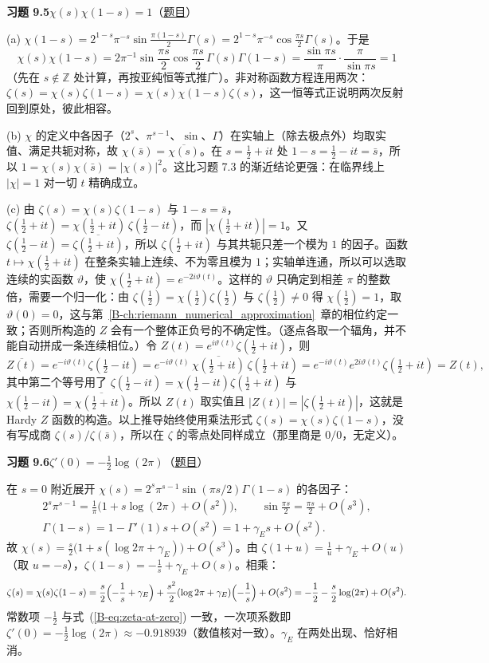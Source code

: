 \documentclass[11pt,a4paper]{article}
\newcommand{\bref}[1]{\ref*{B-#1}}
\newcommand{\Sol}[2]{%
  \par\addvspace{1.2em}\noindent
  \hypertarget{s:#1}{}\textbf{习题 #1\quad #2}\hfill{\small（\hyperlink{q:#1}{题目}）}\par
  \nopagebreak\smallskip}
\begin{document}
\Sol{9.5}{$\chi(s)\chi(1-s)=1$}
(a) $\chi(1-s)=2^{1-s}\pi^{-s}\sin\frac{\pi(1-s)}2\Gamma(s)=2^{1-s}\pi^{-s}\cos\frac{\pi s}2\Gamma(s)$。于是
\[
  \chi(s)\chi(1-s)=2\pi^{-1}\sin\frac{\pi s}2\cos\frac{\pi s}2\,\Gamma(s)\Gamma(1-s)=\frac{\sin\pi s}{\pi}\cdot\frac{\pi}{\sin\pi s}=1
\]
（先在 $s\notin\mathbb Z$ 处计算，再按亚纯恒等式推广）。非对称函数方程连用两次：$\zeta(s)=\chi(s)\zeta(1-s)=\chi(s)\chi(1-s)\zeta(s)$，这一恒等式正说明两次反射回到原处，彼此相容。

(b) $\chi$ 的定义中各因子（$2^s$、$\pi^{s-1}$、$\sin$、$\Gamma$）在实轴上（除去极点外）均取实值、满足共轭对称，故 $\chi(\bar s)=\overline{\chi(s)}$。在 $s=\tfrac12+it$ 处 $1-s=\tfrac12-it=\bar s$，所以
$1=\chi(s)\chi(\bar s)=|\chi(s)|^2$。这比习题 7.3 的渐近结论更强：在临界线上 $|\chi|=1$ 对一切 $t$ 精确成立。

(c) 由 $\zeta(s)=\chi(s)\zeta(1-s)$ 与 $1-s=\bar s$，$\zeta(\tfrac12+it)=\chi(\tfrac12+it)\,\zeta(\tfrac12-it)$，而 $|\chi(\tfrac12+it)|=1$。又 $\zeta(\tfrac12-it)=\overline{\zeta(\tfrac12+it)}$，所以 $\zeta(\tfrac12+it)$ 与其共轭只差一个模为 $1$ 的因子。函数 $t\mapsto\chi(\tfrac12+it)$ 在整条实轴上连续、不为零且模为 $1$；实轴单连通，所以可以选取连续的实函数 $\vartheta$，使 $\chi(\tfrac12+it)=e^{-2i\vartheta(t)}$。这样的 $\vartheta$ 只确定到相差 $\pi$ 的整数倍，需要一个归一化：由 $\zeta(\tfrac12)=\chi(\tfrac12)\zeta(\tfrac12)$ 与 $\zeta(\tfrac12)\ne0$ 得 $\chi(\tfrac12)=1$，取 $\vartheta(0)=0$，这与第~\bref{ch:riemann_numerical_approximation}~章的相位约定一致；否则所构造的 $Z$ 会有一个整体正负号的不确定性。（逐点各取一个辐角，并不能自动拼成一条连续相位。）令 $Z(t)=e^{i\vartheta(t)}\zeta(\tfrac12+it)$，则
\[
  \overline{Z(t)}=e^{-i\vartheta(t)}\zeta(\tfrac12-it)=e^{-i\vartheta(t)}\,\overline{\chi(\tfrac12+it)}\,\zeta(\tfrac12+it)=e^{-i\vartheta(t)}e^{2i\vartheta(t)}\zeta(\tfrac12+it)=Z(t),
\]
其中第二个等号用了 $\zeta(\tfrac12-it)=\chi(\tfrac12-it)\zeta(\tfrac12+it)$ 与 $\chi(\tfrac12-it)=\overline{\chi(\tfrac12+it)}$。所以 $Z(t)$ 取实值且 $|Z(t)|=|\zeta(\tfrac12+it)|$，这就是 Hardy $Z$ 函数的构造。以上推导始终使用乘法形式 $\zeta(s)=\chi(s)\zeta(1-s)$，没有写成商 $\zeta(s)/\zeta(\bar s)$，所以在 $\zeta$ 的零点处同样成立（那里商是 $0/0$，无定义）。

\Sol{9.6}{$\zeta'(0)=-\tfrac12\log(2\pi)$}
在 $s=0$ 附近展开 $\chi(s)=2^s\pi^{s-1}\sin(\pi s/2)\Gamma(1-s)$ 的各因子：
\[
\begin{gathered}
  2^s\pi^{s-1}=\frac1\pi\bigl(1+s\log(2\pi)+O(s^2)\bigr),\qquad
  \sin\frac{\pi s}2=\frac{\pi s}2+O(s^3),\\
  \Gamma(1-s)=1-\Gamma'(1)s+O(s^2)=1+\gamma_E s+O(s^2).
\end{gathered}
\]
故 $\chi(s)=\frac s2\bigl(1+s(\log2\pi+\gamma_E)\bigr)+O(s^3)$。由 $\zeta(1+u)=\frac1u+\gamma_E+O(u)$（取 $u=-s$），$\zeta(1-s)=-\frac1s+\gamma_E+O(s)$。相乘：
\[
  \zeta(s)=\chi(s)\zeta(1-s)=\frac s2\Bigl(-\frac1s+\gamma_E\Bigr)+\frac{s^2}2(\log2\pi+\gamma_E)\Bigl(-\frac1s\Bigr)+O(s^2)
  =-\frac12-\frac s2\log(2\pi)+O(s^2).
\]
常数项 $-\tfrac12$ 与式~(\bref{eq:zeta-at-zero}) 一致，一次项系数即 $\zeta'(0)=-\tfrac12\log(2\pi)\approx-0.918939$（数值核对一致）。$\gamma_E$ 在两处出现、恰好相消。
\end{document}
